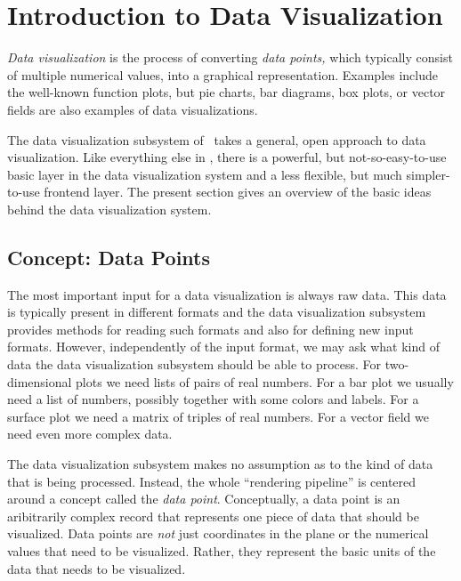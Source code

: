 %
%
%


\section{Introduction to Data Visualization}

\emph{Data visualization} is the process of converting \emph{data
  points,} which typically consist of multiple numerical values, into
a graphical representation. Examples include the well-known function
plots, but pie charts, bar diagrams, box plots, or vector fields are
also examples of data visualizations.

The data visualization subsystem of \pgfname\ takes a general, open
approach to data visualization. Like everything else in \pgfname,
there is a powerful, but not-so-easy-to-use basic layer in the data
visualization system and a less flexible, but much simpler-to-use
frontend layer. The present section gives an overview of the
basic ideas behind the data visualization system.


\subsection{Concept: Data Points}

\label{section-dv-intro-data-points}

The most important input for a data visualization is always raw
data. This data is typically present in different formats and the data
visualization subsystem provides methods for reading such formats and
also for defining new input formats. However, independently of the
input format, we may ask what kind of data the data visualization
subsystem should be able to process. For two-dimensional plots we
need lists of pairs of real numbers. For a bar plot we usually need a
list of numbers, possibly together with some colors and labels. For a
surface plot we need a matrix of triples of real numbers. For a vector
field we need even more complex data.

The data visualization subsystem makes no assumption as to
the kind of data that is being processed. Instead, the whole
``rendering pipeline'' is centered around a concept called the
\emph{data point}. Conceptually, a data point is an aribitrarily
complex record that represents one piece of data that should be
visualized. Data points are \emph{not} just coordinates in the plane
or the numerical values that need to be visualized. Rather, they
represent the basic units of the data that needs to be visualized.

